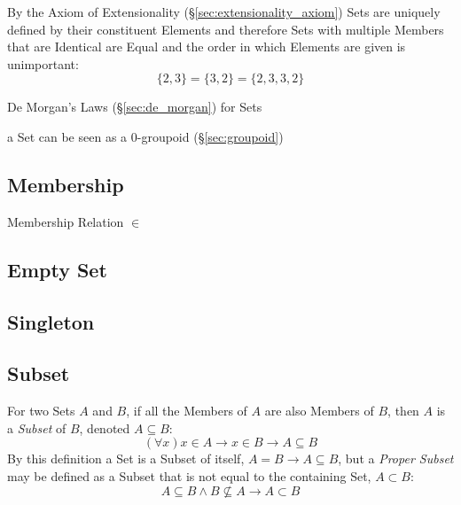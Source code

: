 By the Axiom of Extensionality (\S\ref{sec:extensionality_axiom}) Sets
are uniquely defined by their constituent Elements and therefore Sets
with multiple Members that are Identical are Equal and the order in
which Elements are given is unimportant:
\[
  \{ 2, 3 \} = \{ 3, 2 \} = \{ 2, 3, 3, 2 \}
\]

De Morgan's Laws (\S\ref{sec:de_morgan}) for Sets

a Set can be seen as a $0$-groupoid (\S\ref{sec:groupoid})



\subsection{Membership}\label{sec:membership}

Membership Relation $\in$



\subsection{Empty Set}\label{sec:empty_set}

\subsection{Singleton}\label{sec:singleton}

\subsection{Subset}\label{sec:subset}

For two Sets $A$ and $B$, if all the Members of $A$ are also Members
of $B$, then $A$ is a \emph{Subset} of $B$, denoted $A \subseteq B$:
\[
  (\forall x) x \in A \to x \in B \to A \subseteq B
\]
By this definition a Set is a Subset of itself, $A = B \to A
\subseteq B$, but a \emph{Proper Subset} may be defined as a Subset
that is not equal to the containing Set, $A \subset B$:
\[
  A \subseteq B \wedge B \nsubseteq A \to A \subset B
\]

